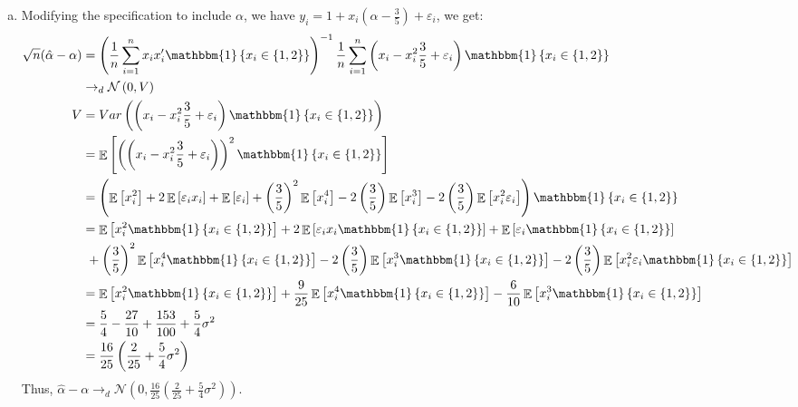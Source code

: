 \documentclass{article}
\newcommand{\N}{\mathcal{N}}
\newcommand{\est}[1]{\frac{1}{#1}\sum_{i=1}^{#1}}
\newcommand{\ahat}{\hat{\alpha}}
\newcommand{\one}[1]{\mathbbm{1}\left\{#1\right\}}
\DeclareMathOperator{\E}{\mathbb{E}}%
\renewcommand{\exp}[1]{\E\left[#1\right]}
\begin{document}
\begin{enumerate}[(a)]
	\item Modifying the specification to include $\alpha$, we have ${y_i = 1 + x_i\left(\alpha-\frac{3}{5}\right) + \varepsilon_i}$, we get:
	{\small
		\begin{align*}
			\sqrt{n}(\ahat-\alpha)	&= \left(\est{n}x_ix_i'\one{x_i\in\{1,2\}}\right)^{-1}\est{n}\left(x_i-x_i^2\frac{3}{5}+\varepsilon_i\right)\one{x_i\in\{1,2\}}	\\
									&\rightarrow_d \N\left(0,V\right)	\\
								V 	&= Var\left(\left(x_i-x_i^2\frac{3}{5}+\varepsilon_i\right)\one{x_i\in\{1,2\}}\right)				\\
									&= \E\left[\left(\left(x_i-x_i^2\frac{3}{5}+\varepsilon_i\right)\right)^2\one{x_i\in\{1,2\}}\right]	\\
									&= \left(\exp{x_i^2} + 2\exp{\varepsilon_ix_i} + \exp{\varepsilon_i} + \left(\frac{3}{5}\right)^2\exp{x_i^4} - 2\left(\frac{3}{5}\right)\exp{x^3_i} - 2\left(\frac{3}{5}\right)\exp{x_i^2\varepsilon_i}\right)\one{x_i\in\{1,2\}}	\\
									&= \exp{x_i^2\one{x_i\in\{1,2\}}} + 2\exp{\varepsilon_ix_i\one{x_i\in\{1,2\}}} + \exp{\varepsilon_i\one{x_i\in\{1,2\}}}  	\\
									&\text{  }+ \left(\frac{3}{5}\right)^2\exp{x_i^4\one{x_i\in\{1,2\}}}- 2\left(\frac{3}{5}\right)\exp{x^3_i\one{x_i\in\{1,2\}}} - 2\left(\frac{3}{5}\right)\exp{x_i^2\varepsilon_i\one{x_i\in\{1,2\}}}	\\
									&= \exp{x_i^2\one{x_i\in\{1,2\}}} + \frac{9}{25}\exp{x_i^4\one{x_i\in\{1,2\}}}- \frac{6}{10}\exp{x^3_i\one{x_i\in\{1,2\}}}	\\
									&= \frac{5}{4} - \frac{27}{10} + \frac{153}{100} + \frac{5}{4}\sigma^2 \\
									&= \frac{16}{25}\left(\frac{2}{25} + \frac{5}{4}\sigma^2\right)
		\end{align*}
	}%
		Thus, ${\hat{\alpha}-\alpha \rightarrow_d \N\left(0,\frac{16}{25}\left(\frac{2}{25} + \frac{5}{4}\sigma^2\right)\right)}$.
	
\end{enumerate}

\end{document}

